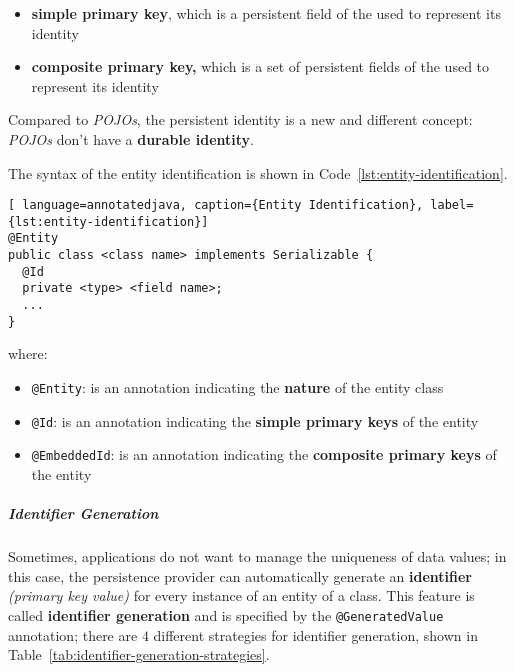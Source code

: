 \documentclass[english]{article}
\begin{document}
\begin{itemize}
  \item \textbf{simple primary key}, which is a persistent field of the \javab used to represent its identity
  \item \textbf{composite primary key,} which is a set of persistent fields of the \javab used to represent its identity
\end{itemize}

Compared to \textit{POJOs}, the persistent identity is a new and different concept: \textit{POJOs} don't have a \textbf{durable identity}.

The syntax of the entity identification is shown in Code~\ref{lst:entity-identification}.

\begin{lstlisting}[ language=annotatedjava, caption={Entity Identification}, label={lst:entity-identification}]
@Entity
public class <class name> implements Serializable {
  @Id
  private <type> <field name>;
  ...
}
\end{lstlisting}

where:
\begin{itemize}[label=\textbf{\texttt{>}}]
  \item \texttt{@Entity}: is an annotation indicating the \textbf{nature} of the entity class
  \item \texttt{@Id}: is an annotation indicating the \textbf{simple primary keys} of the entity
  \item \texttt{@EmbeddedId}: is an annotation indicating the \textbf{composite primary keys} of the entity
\end{itemize}

\subparagraph*{Identifier Generation}
Sometimes, applications do not want to manage the uniqueness of data values;
in this case, the persistence provider can automatically generate an \textbf{identifier} \textit{(primary key value)} for every instance of an entity of a class.
This feature is called \textbf{identifier generation} and is specified by the \texttt{@GeneratedValue} annotation;
there are \(4\) different strategies for identifier generation, shown in Table~\ref{tab:identifier-generation-strategies}.
\end{document}
